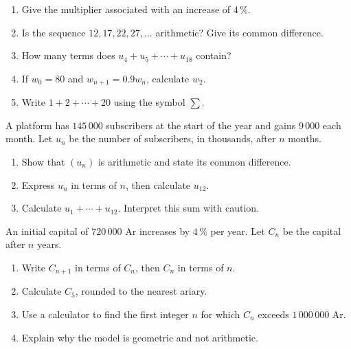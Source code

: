 
\begin{exercice}[1 -- Fluency]
\begin{enumerate}
\item Give the multiplier associated with an increase of $4\,\%$.
\item Is the sequence $12,17,22,27,\ldots$ arithmetic? Give its common difference.
\item How many terms does $u_4+u_5+\cdots+u_{18}$ contain?
\item If $w_0=80$ and $w_{n+1}=0.9w_n$, calculate $w_2$.
\item Write $1+2+\cdots+20$ using the symbol $\sum$.
\end{enumerate}
\end{exercice}
\begin{exercice}[2 -- Subscriptions]
A platform has $145\,000$ subscribers at the start of the year and gains $9\,000$ each month. Let $u_n$ be the number of subscribers, in thousands, after $n$ months.
\begin{enumerate}
\item Show that $(u_n)$ is arithmetic and state its common difference.
\item Express $u_n$ in terms of $n$, then calculate $u_{12}$.
\item Calculate $u_1+\cdots+u_{12}$. Interpret this sum with caution.
\end{enumerate}
\end{exercice}
\begin{exercice}
An initial capital of $720\,000$ Ar increases by $4\,\%$ per year. Let $C_n$ be the capital after $n$ years.
\begin{enumerate}
\item Write $C_{n+1}$ in terms of $C_n$, then $C_n$ in terms of $n$.
\item Calculate $C_5$, rounded to the nearest ariary.
\item Use a calculator to find the first integer $n$ for which $C_n$ exceeds $1\,000\,000$ Ar.
\item Explain why the model is geometric and not arithmetic.
\end{enumerate}
\end{exercice}
